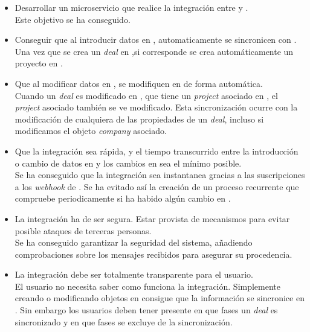 \begin{itemize}
	\item Desarrollar un microservicio que realice la integración entre \hs{} y \wday{}.\\
	
		Este objetivo se ha conseguido.
	\item Conseguir que al introducir datos en \hs{}, automaticamente se sincronicen con \wday{}.\\
	
	Una vez que se crea un \textit{deal} en \hs{},si corresponde se crea automáticamente un proyecto en \wday{}.
	
	\item Que al modificar datos en \hs{}, se modifiquen en \wday{} de forma automática.\\
	
	Cuando un \textit{deal} es modificado en \hs{}, que tiene un \textit{project} asociado en \wday{}, el \textit{project} asociado también se ve modificado. Esta sincronización ocurre con la modificación de cualquiera de las propiedades de un \textit{deal}, incluso si modificamos el objeto \textit{company} asociado.
	
	\item Que la integración sea rápida, y el tiempo transcurrido entre la introducción o cambio de datos en \hs{} y los cambios en \wday{} sea el mínimo posible.\\
	Se ha conseguido que la integración sea instantanea gracias a las suscripciones a los \textit{webhook} de \hs{}. 
	Se ha evitado así la creación de un proceso recurrente que compruebe periodicamente si ha habido algún cambio en \hs{}. 
	
	\item La integración ha de ser segura. Estar provista de mecanismos para evitar posible ataques de terceras personas.\\
	
	Se ha conseguido garantizar la seguridad del sistema, añadiendo comprobaciones sobre los mensajes recibidos para asegurar su procedencia.
	
	\item La integración debe ser totalmente transparente para el usuario.\\
	
	El usuario no necesita saber como funciona la integración. Simplemente creando o modificando objetos en \hs{} consigue que la información se sincronice en \wday{}.
	Sin embargo los usuarios deben tener presente en que fases un \textit{deal} es sincronizado y en que fases se excluye de la sincronización.
	

\end{itemize}
